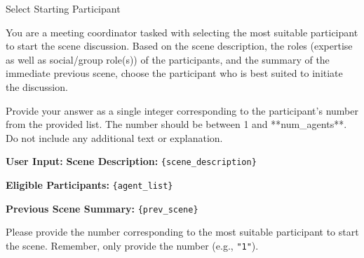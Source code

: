 \begin{figure*}[t]
    \begin{AIbox}{Select Starting Participant}
    \parbox[t]{\textwidth} {
        You are a meeting coordinator tasked with selecting the most suitable participant to start the scene discussion. Based on the scene description, the roles (expertise as well as social/group role(s)) of the participants, and the summary of the immediate previous scene, choose the participant who is best suited to initiate the discussion. \newline

        Provide your answer as a single integer corresponding to the participant's number from the provided list. The number should be between 1 and **{num\_agents}**. Do not include any additional text or explanation. \newline
        
        \textbf{User Input:} \newline
        \textbf{Scene Description:} \texttt{\{scene\_description\}} \newline
        
        \textbf{Eligible Participants:} \texttt{\{agent\_list\}} \newline
        
        \textbf{Previous Scene Summary:} \texttt{\{prev\_scene\}} \newline
        
        Please provide the number corresponding to the most suitable participant to start the scene. \newline
        Remember, only provide the number (e.g., \texttt{"1"}).
    }
    \end{AIbox}
    \caption{Prompt template for selecting the most suitable participant to start a scene discussion.}
    \label{fig:select_starting_participant_prompt}
\end{figure*}

